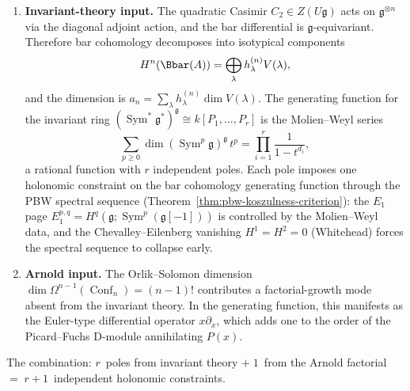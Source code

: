 \begin{enumerate}[label=\textup{(\Roman*)}]
\item \textbf{Invariant-theory input.}
The quadratic Casimir \(C_2\in Z(U\mathfrak g)\) acts on
\(\mathfrak g^{\otimes n}\) via the diagonal adjoint action,
and the bar differential is \(\mathfrak g\)-equivariant.
Therefore bar cohomology decomposes into isotypical components
\[
H^n(\Bbar(A))=\bigoplus_\lambda h_\lambda^{(n)}V(\lambda),
\]
and the dimension is
\(a_n=\sum_\lambda h_\lambda^{(n)}\dim V(\lambda)\).
The generating function for the invariant ring
\((\operatorname{Sym}^*\mathfrak g^*)^{\mathfrak g}\cong
k[P_1,\dots,P_r]\) is the Molien--Weyl series
\begin{equation}\label{eq:molien-weyl-g}
\sum_{p\ge 0}\dim(\operatorname{Sym}^p\mathfrak g)^{\mathfrak g}
\,t^p
=\prod_{i=1}^r\frac{1}{1-t^{d_i}},
\end{equation}
a rational function with \(r\) independent poles.
Each pole imposes one holonomic constraint on the bar
cohomology generating function through the PBW spectral
sequence (Theorem~\ref{thm:pbw-koszulness-criterion}):
the \(E_1\) page
\(E_1^{p,q}=H^q(\mathfrak g;\operatorname{Sym}^p
(\mathfrak g[-1]))\)
is controlled by the Molien--Weyl data, and the
Chevalley--Eilenberg vanishing \(H^1=H^2=0\) (Whitehead)
forces the spectral sequence to collapse early.

\item \textbf{Arnold input.}
The Orlik--Solomon dimension
\(\dim\Omega^{n-1}(\operatorname{Conf}_n)=(n-1)!\)
contributes a factorial-growth mode absent from the invariant
theory.
In the generating function, this manifests as the Euler-type
differential operator \(x\partial_x\), which adds one to the
order of the Picard--Fuchs D-module annihilating \(P(x)\).
\end{enumerate}

The combination: \(r\)~poles from invariant theory
\(+\;1\)~from the Arnold factorial \(=\;r+1\)~independent
holonomic constraints.

